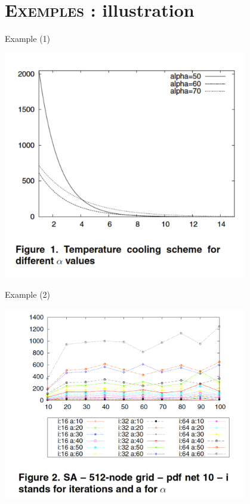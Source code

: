 \documentclass[xcolor=x11names,compress,8pt,fleqn]{beamer}
\renewcommand{\(}{\begin{columns}}
\renewcommand{\)}{\end{columns}}
\newcommand{\<}[1]{\begin{column}{#1}}
\renewcommand{\>}{\end{column}}
\begin{document}
\section[{\scshape Exemples}]{{\scshape Exemples :} illustration}
\begin{frame}{Example (1)}
\begin{center}
\includegraphics[width=0.8\textwidth]{Example1}
\end{center}
\end{frame}

\begin{frame}{Example (2)}
\begin{center}
\includegraphics[width=0.8\textwidth]{Example2}
\end{center}
\end{frame}
\end{document}
